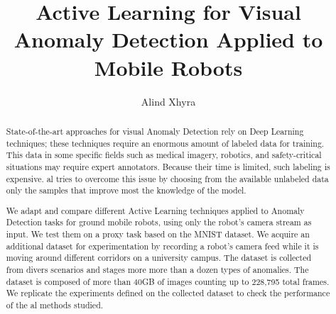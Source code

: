 \documentclass[mscthesis, 12pt, a4paper, oneside]{usiinfthesis}
\title{Active Learning for Visual Anomaly Detection Applied to Mobile Robots} %
\author{Alind Xhyra} %
\begin{document}
\maketitle %

\frontmatter %

\begin{abstract}



State-of-the-art approaches for visual Anomaly Detection rely on Deep Learning techniques; these techniques require an enormous amount of labeled data for training. This data in some specific fields such as medical imagery, robotics, and safety-critical situations may require expert annotators. Because their time is limited, such labeling is expensive.
\acrfull{al} tries to overcome this issue by choosing from the available unlabeled data only the samples that improve most the knowledge of the model.


We adapt and compare different Active Learning techniques applied to Anomaly Detection tasks for ground mobile robots, using only the robot's camera stream as input. We test them on a proxy task based on the MNIST dataset. We acquire an additional dataset for experimentation by recording a robot's camera feed while it is moving around different corridors on a university campus. The dataset is collected from divers scenarios and stages more more than a dozen types of anomalies. The dataset is composed of more than 40GB of images counting up to 228,795 total frames. We replicate the experiments defined on the collected dataset to check the performance of the \acrshort{al} methods studied.





\end{abstract}
\end{document}
